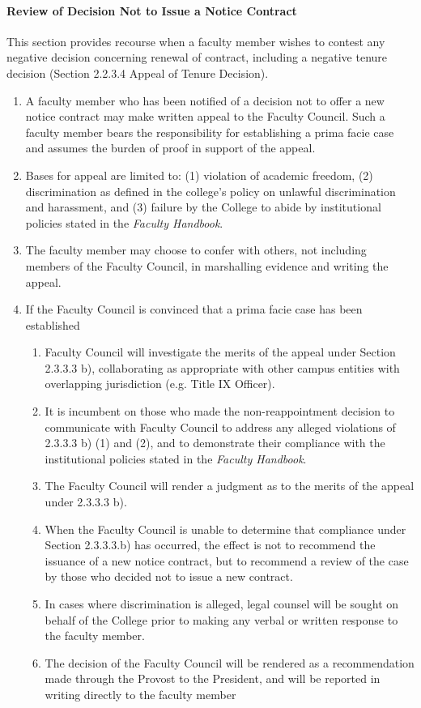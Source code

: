 \documentclass[letterpaper, 11pt]{article}
\begin{document}
			\paragraph{Review of Decision Not to Issue a Notice Contract}
				This section provides recourse when a faculty member wishes to contest any negative decision concerning renewal of contract, including a negative tenure decision (Section 2.2.3.4 Appeal of Tenure Decision).
				\begin{enumerate}[label=\alph*)]
					\item{A faculty member who has been notified of a decision not to offer a new notice contract may make written appeal to the Faculty Council.  Such a faculty member bears the responsibility for establishing a prima facie case and assumes the burden of proof in support of the appeal.}
					\item{Bases for appeal are limited to: (1) violation of academic freedom, (2) discrimination as defined in the college's policy on unlawful discrimination and harassment, and (3) failure by the College to abide by institutional policies stated in the \emph{Faculty Handbook}.}
					\item{The faculty member may choose to confer with others, not including members of the Faculty Council, in marshalling evidence and writing the appeal.}
					\item{If the Faculty Council is convinced that a prima facie case has been established
						\begin{enumerate}[label=\arabic*)]
							\item{Faculty Council will investigate the merits of the appeal under Section 2.3.3.3 b), collaborating as appropriate with other campus entities with overlapping jurisdiction (e.g. Title IX Officer).}
							\item{It is incumbent on those who made the non-reappointment decision to communicate with Faculty Council to address any alleged violations of 2.3.3.3 b) (1) and (2), and to demonstrate their compliance with the institutional policies stated in the \emph{Faculty Handbook}.}
							\item{The Faculty Council will render a judgment as to the merits of the appeal under 2.3.3.3 b).}
							\item{When the Faculty Council is unable to determine that compliance under Section 2.3.3.3.b) has occurred, the effect is not to recommend the issuance of a new notice contract, but to recommend a review of the case by those who decided not to issue a new contract.}
							\item{In cases where discrimination is alleged, legal counsel will be sought on behalf of the College prior to making any verbal or written response to the faculty member.}
							\item{The decision of the Faculty Council will be rendered as a recommendation made through the Provost to the President, and will be reported in writing directly to the faculty member}
						\end{enumerate}
					}
				\end{enumerate}
\end{document}
